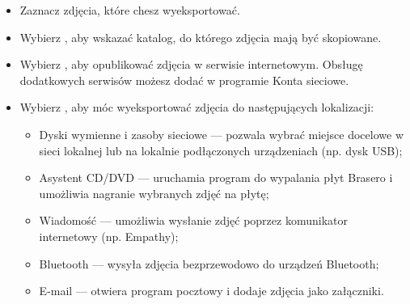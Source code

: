 \begin{itemize}
\item Zaznacz zdjęcia, które chesz wyeksportować.
\item Wybierz , aby wskazać katalog, do którego zdjęcia mają być skopiowane.
\item Wybierz , aby opublikować zdjęcia w serwisie internetowym. Obsługę dodatkowych serwisów możesz dodać w programie \textcolor{ubuntu_orange}{Konta sieciowe}.
\item Wybierz , aby móc wyeksportować zdjęcia do następujących lokalizacji:
	\begin{itemize}
	\item \textcolor{ubuntu_orange}{Dyski wymienne i zasoby sieciowe} --- pozwala wybrać miejsce docelowe w sieci lokalnej lub na lokalnie podłączonych urządzeniach (np. dysk USB);
	\item \textcolor{ubuntu_orange}{Asystent CD/DVD} --- uruchamia program do wypalania płyt Brasero i umożliwia nagranie wybranych zdjęć na płytę;
	\item \textcolor{ubuntu_orange}{Wiadomość} --- umożliwia wysłanie zdjęć poprzez komunikator internetowy (np. Empathy);
	\item \textcolor{ubuntu_orange}{Bluetooth} --- wysyła zdjęcia bezprzewodowo do urządzeń Bluetooth;
	\item \textcolor{ubuntu_orange}{E-mail} --- otwiera program pocztowy i dodaje zdjęcia jako załączniki.
	\end{itemize}	
\end{itemize}
